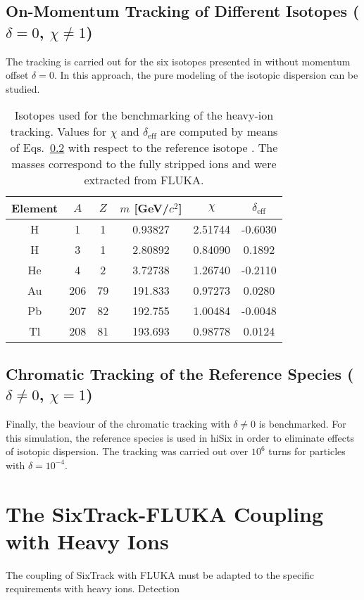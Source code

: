 \subsection{On-Momentum Tracking of Different Isotopes ($\delta =0$, $\chi \neq 1$)}

The tracking is carried out for the six isotopes presented in  without momentum offset $\delta=0$. In this approach, the pure modeling of the isotopic dispersion can be studied.





\begin{table}[h]
\centering
\caption{Isotopes used for the benchmarking of the heavy-ion tracking. Values for $\chi$ and $\delta_\text{eff}$ are computed by means of Eqs.~\ref{} with respect to the reference isotope \lead. The masses correspond to the fully stripped ions and were extracted from FLUKA.}
\label{tab:15080501}
\begin{tabular}{cccccc}
\toprule
Element & $A$ & $Z$ & $m$ [GeV/$c^2$] & $\chi$   & $\delta_\text{eff}$ \\ \midrule
H       & \phantom{12}1   & \phantom{1}1   & 0.93827         & 2.51744  & -0.6030              \\
H       & \phantom{12}3   & \phantom{1}1   & 2.80892      & 0.84090  & \phantom{-}0.1892              \\
He      & \phantom{12}4   & \phantom{1}2   & 3.72738         & 1.26740  & -0.2110              \\
Au      & 206 & 79  & 191.833      & 0.97273  & \phantom{-}0.0280             \\
Pb      & 207 & 82  & 192.755      & 1.00484  & -0.0048             \\
Tl      & 208 & 81  & 193.693      & 0.98778 & \phantom{-}0.0124           \\ \bottomrule
\end{tabular}
\end{table}



\subsection{Chromatic Tracking of the Reference Species ($\delta \neq0$, $\chi = 1$)}

Finally, the beaviour of the chromatic tracking with $\delta \neq 0$ is benchmarked. For this simulation, the reference species is used in hiSix in order to eliminate effects of isotopic dispersion. The tracking was carried out over $10^6$ turns for particles with $\delta = 10^{-4}$.

\section{The SixTrack-FLUKA Coupling with Heavy Ions} \label{chap:hisix_coupling}

The coupling of SixTrack with FLUKA must be adapted to the specific requirements with heavy ions. Detection 